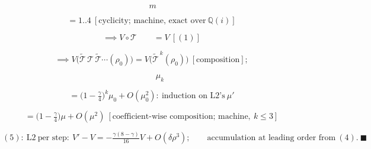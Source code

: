 \begin{theorem}
\[
\ m
\]

\[
= 1..4\ [\text{cyclicity; machine, exact over}\ \mathbb Q(i)]
\]

\[
\implies V\circ\mathcal T\qquad = V\ [(1)]
\]

\[
\implies V\bigl(\tilde{\mathcal T}\,\mathcal T\,\tilde{\mathcal T}\cdots(\rho_0)\bigr)=V\bigl(\tilde{\mathcal T}^{\,k}(\rho_0)\bigr)\ [\text{composition}];
\]

\[
\qquad \mu_k
\]

\[
= \bigl(1-\tfrac\gamma4\bigr)^k\mu_0+O(\mu_0^2):\ \text{induction on L2's}\ \mu'
\]

\[
= \bigl(1-\tfrac\gamma4\bigr)\mu+O(\mu^2)\ [\text{coefficient-wise composition; machine},\ k\le3]
\]

\[
(5):\ \mathrm{L2}\ \text{per step}:\ V'-V=-\tfrac{\gamma(8-\gamma)}{16}V+O(\delta\rho^3);\qquad
\text{accumulation at leading order from}\ (4).\ \blacksquare
\]

\end{theorem}

